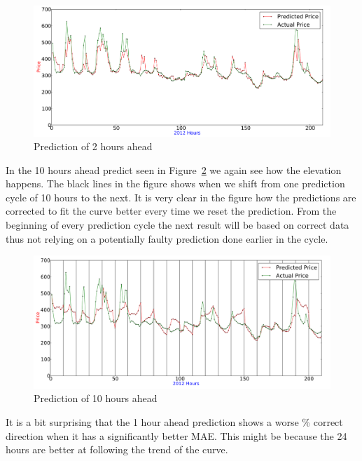 \begin{figure}[H]
\centering
\includegraphics[width=\linewidth]{billeder/PriceExperimentalAnalysis/2HoursAheadForecast.png}
\caption{Prediction of 2 hours ahead}
\label{fig:2HoursAhead}
\end{figure}

In the 10 hours ahead predict seen in Figure~\ref{fig:10HoursAhead} we again see how the elevation happens. The black lines in the figure shows when we shift from one prediction cycle of 10 hours to the next. It is very clear in the figure how the predictions are corrected to fit the curve better every time we reset the prediction. From the beginning of every prediction cycle the next result will be based on correct data thus not relying on a potentially faulty prediction done earlier in the cycle.

\begin{figure}[H]
\centering
\includegraphics[width=\linewidth]{billeder/PriceExperimentalAnalysis/10HoursAhead.png}
\caption{Prediction of 10 hours ahead}
\label{fig:10HoursAhead}
\end{figure}

It is a bit surprising that the 1 hour ahead prediction shows a worse \% correct direction when it has a significantly better MAE. This might be because the 24 hours are better at following the trend of the curve.


